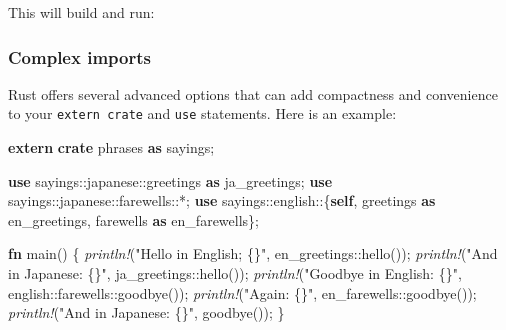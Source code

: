 \documentclass[a4paper,]{book}
\newenvironment{Shaded}{\begin{snugshade}}{\end{snugshade}}
\newcommand{\KeywordTok}[1]{\textcolor[rgb]{0.13,0.29,0.53}{\textbf{{#1}}}}
\newcommand{\StringTok}[1]{\textcolor[rgb]{0.31,0.60,0.02}{{#1}}}
\newcommand{\PreprocessorTok}[1]{\textcolor[rgb]{0.56,0.35,0.01}{\textit{{#1}}}}
\newcommand{\NormalTok}[1]{{#1}}
\begin{document}
This will build and run:

\begin{Shaded}
\end{Shaded}

\subsubsection{Complex imports}\label{complex-imports}

Rust offers several advanced options that can add compactness and
convenience to your \texttt{extern\ crate} and \texttt{use} statements.
Here is an example:

\begin{Shaded}
\begin{Highlighting}[]
\KeywordTok{extern} \KeywordTok{crate} \NormalTok{phrases }\KeywordTok{as} \NormalTok{sayings;}

\KeywordTok{use} \NormalTok{sayings::japanese::greetings }\KeywordTok{as} \NormalTok{ja_greetings;}
\KeywordTok{use} \NormalTok{sayings::japanese::farewells::*;}
\KeywordTok{use} \NormalTok{sayings::english::\{}\KeywordTok{self}\NormalTok{, greetings }\KeywordTok{as} \NormalTok{en_greetings, farewells }\KeywordTok{as} \NormalTok{en_farewells\};}

\KeywordTok{fn} \NormalTok{main() \{}
    \PreprocessorTok{println!}\NormalTok{(}\StringTok{"Hello in English; \{\}"}\NormalTok{, en_greetings::hello());}
    \PreprocessorTok{println!}\NormalTok{(}\StringTok{"And in Japanese: \{\}"}\NormalTok{, ja_greetings::hello());}
    \PreprocessorTok{println!}\NormalTok{(}\StringTok{"Goodbye in English: \{\}"}\NormalTok{, english::farewells::goodbye());}
    \PreprocessorTok{println!}\NormalTok{(}\StringTok{"Again: \{\}"}\NormalTok{, en_farewells::goodbye());}
    \PreprocessorTok{println!}\NormalTok{(}\StringTok{"And in Japanese: \{\}"}\NormalTok{, goodbye());}
\NormalTok{\}}
\end{Highlighting}
\end{Shaded}
\end{document}
